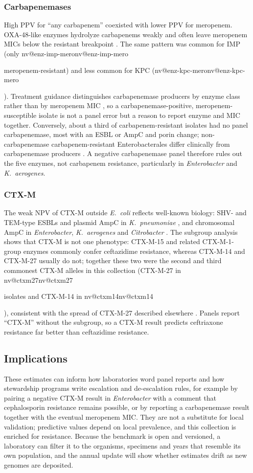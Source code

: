 \documentclass[10pt,twocolumn,letterpaper]{article}
\makeatletter
\newcommand{\nv}[1]{\ifcsname nv@#1\endcsname\csname nv@#1\endcsname\else
  \PackageError{numbers}{Unknown number key: #1}{Run build_assets.py}\fi}
\newcommand{\eco}{\textit{E.~coli}}
\newcommand{\kpn}{\textit{K.~pneumoniae}}
\makeatother
\begin{document}
\subsubsection{Carbapenemases}
High PPV for ``any carbapenem'' coexisted with lower PPV for meropenem. OXA-48-like enzymes hydrolyze carbapenems weakly
and often leave meropenem MICs below the resistant breakpoint \cite{poirel2012}. The same pattern was common for IMP
(only \nv{enz-imp-mero} meropenem-resistant) and less common for KPC (\nv{enz-kpc-mero}). Treatment guidance distinguishes carbapenemase producers by enzyme class rather than by meropenem MIC
\cite{idsa2024}, so a carbapenemase-positive, meropenem-susceptible isolate is not a panel error but a reason to report
enzyme and MIC together. Conversely, about a third of carbapenem-resistant isolates had no panel carbapenemase, most with an
ESBL or AmpC and porin change; non-carbapenemase carbapenem-resistant Enterobacterales differ clinically from
carbapenemase producers \cite{tamma2017}. A negative carbapenemase panel therefore rules out the five enzymes, not carbapenem
resistance, particularly in \textit{Enterobacter} and \textit{K.~aerogenes}.

\subsubsection{CTX-M}
The weak NPV of CTX-M outside \eco{} reflects well-known biology: SHV- and TEM-type ESBLs and plasmid AmpC in \kpn{}
\cite{bush2020}, and chromosomal AmpC in \textit{Enterobacter}, \textit{K.~aerogenes} and \textit{Citrobacter}
\cite{jacoby2009}. The subgroup analysis shows that CTX-M is not one phenotype: CTX-M-15 and related CTX-M-1-group enzymes
commonly confer ceftazidime resistance, whereas CTX-M-14 and CTX-M-27 usually do not; together these two were the second and third
commonest CTX-M alleles in this collection (CTX-M-27 in \nv{ctxm27} isolates and CTX-M-14 in \nv{ctxm14}), consistent with the spread of CTX-M-27
described elsewhere \cite{bevan2017}. Panels report ``CTX-M'' without the subgroup, so a CTX-M result predicts ceftriaxone resistance far better
than ceftazidime resistance.

\subsection{Implications}

These estimates can inform how laboratories word panel reports and how stewardship programs write escalation and
de-escalation rules, for example by pairing a negative CTX-M result in \textit{Enterobacter} with a comment that
cephalosporin resistance remains possible, or by reporting a carbapenemase result together with the eventual meropenem MIC.
They are not a substitute for local validation; predictive values depend on local prevalence, and this collection is
enriched for resistance. Because the benchmark is open and versioned, a laboratory can filter it to the organisms,
specimens and years that resemble its own population, and the annual update will show whether estimates drift as new
genomes are deposited.
\end{document}
